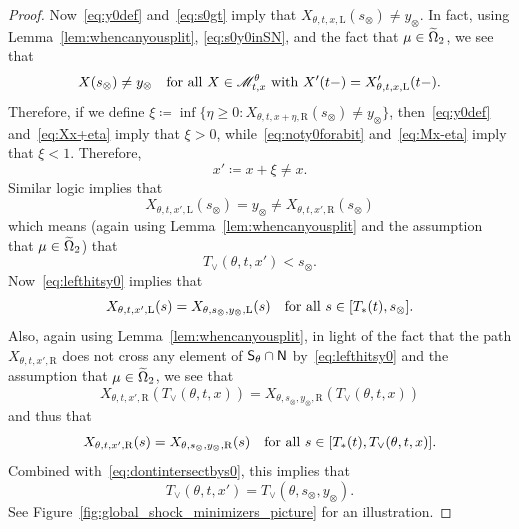 \documentclass[AHL,Unicode,longabstracts]{cedram}
\newcommand*\ssS{\mathsf{S}}
\newcommand*\ssN{\mathsf{N}}
\newcommand*\scM{\mathscr{M}}
\newcommand*\st{\mathrel{:}}
\newcommand*\Left{\mathrm{L}}
\newcommand*\Right{\mathrm{R}}
\let\oldin\in
\renewcommand{\in}{\mathchoice{\oldin}{\oldin}{\,\oldin\,}{\,\oldin\,}}
\let\oldcap\cap
\renewcommand{\cap}{\mathchoice{\oldcap}{\oldcap}{\,\oldcap\,}{\,\oldcap\,}}
\begin{document}
\begin{proof}
Now~\eqref{eq:y0def} and~\eqref{eq:s0gt} imply that $X_{\theta,t,x,\Left}(s_{\otimes})\ne y_{\otimes}$. In fact, using Lemma~\ref{lem:whencanyousplit}, \eqref{eq:s0y0inSN}, and the fact that $\mu\in\widetilde{\Omega}_{2}$, we see that
\begin{equation}\label{eq:noty0forabit}
X(s_{\otimes})\ne y_{\otimes}\quad\text{for all }X\in\scM_{t,x}^{\theta}\text{ with }X'(t-)=X_{\theta,t,x,\Left}'(t-).
\end{equation}
Therefore, if we define $\xi\coloneqq\inf\{\eta\ge0\st X_{\theta,t,x+\eta,\Right}(s_{\otimes})\ne y_{\otimes}\}$, then~\eqref{eq:y0def} and~\eqref{eq:Xx+eta} imply that $\xi>0$, while~\eqref{eq:noty0forabit} and~\eqref{eq:Mx-eta} imply that $\xi<1$. Therefore,
\begin{equation}\label{eq:xprimedef}
x'\coloneqq x+\xi\ne x.
\end{equation}
Similar logic implies that
\begin{equation}\label{eq:lefthitsy0}
X_{\theta,t,x',\Left}(s_{\otimes})=y_{\otimes}\ne X_{\theta,t,x',\Right}(s_{\otimes})
\end{equation}
which means (again using Lemma~\ref{lem:whencanyousplit} and the assumption that $\mu\in\widetilde{\Omega}_{2}$) that
\begin{equation}\label{eq:dontintersectbys0}
T_{\vee}(\theta,t,x')<s_{\otimes}.
\end{equation}
Now~\eqref{eq:lefthitsy0} implies that
\begin{equation}\label{eq:follows0y0}
X_{\theta,t,x',\Left}(s)=X_{\theta,s_{\otimes},y_{\otimes},\Left}(s)\quad\text{for all }s\in[T_{*}(t),s_{\otimes}].
\end{equation}
Also, again using Lemma~\ref{lem:whencanyousplit}, in light of the fact that the path $X_{\theta,t,x',\Right}$ does not cross any element of $\ssS_{\theta}\cap\ssN$ by~\eqref{eq:lefthitsy0} and the assumption that $\mu\in\widetilde{\Omega}_{2}$, we see that
\[
X_{\theta,t,x',\Right}(T_{\vee}(\theta,t,x))=X_{\theta,s_{\otimes},y_{\otimes},\Right}(T_{\vee}(\theta,t,x))
\]
and thus that
\[
X_{\theta,t,x',\Right}(s)=X_{\theta,s_{\otimes},y_{\otimes},\Right}(s)\quad\text{for all }s\in[T_{*}(t),T_{\vee}(\theta,t,x)].
\]
Combined with~\eqref{eq:dontintersectbys0}, this implies that
\[
T_{\vee}(\theta,t,x')=T_{\vee}(\theta,s_{\otimes},y_{\otimes}).
\]
See Figure~\ref{fig:global_shock_minimizers_picture} for an illustration.




\end{proof}
\end{document}
